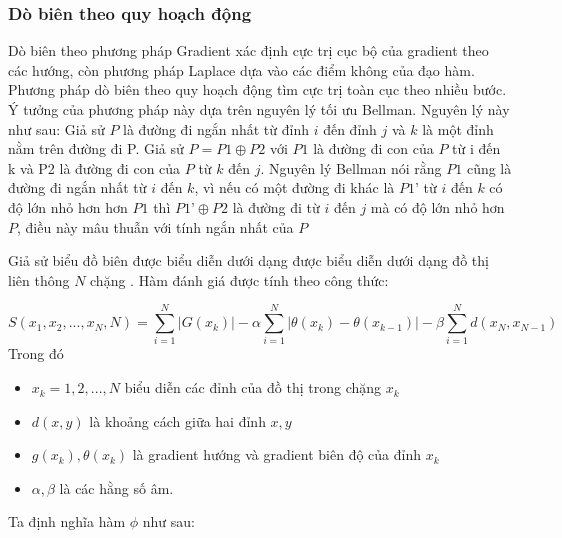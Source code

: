 \documentclass[12pt,oneside,a4]{report}
\begin{document}
\subsubsection{Dò biên theo quy hoạch động}
Dò biên theo phương pháp Gradient xác định cực trị cục bộ của gradient theo các hướng, còn phương pháp Laplace dựa vào các điểm không của đạo hàm. Phương pháp dò biên theo quy hoạch động tìm cực trị toàn cục theo nhiều bước. Ý tưởng của phương pháp này dựa trên nguyên lý tối ưu Bellman. Nguyên lý này như sau:
Giả sử $P$ là đường đi ngắn nhất từ đỉnh $i$ đến đỉnh $j$ và $k$ là một đỉnh nằm trên đường đi P. Giả sử $P=P1\oplus P2$ với $P1$ là đường đi con của $P$ từ i đến k và P2 là đường đi con của $P$ từ $k$ đến $j$. Nguyên lý Bellman nói rằng $P1$ cũng là đường đi ngắn nhất từ $i$ đến $k$, vì nếu có một đường đi khác là $P1’$ từ $i$ đến $k$ có độ lớn nhỏ hơn hơn $P1$ thì $P1’\oplus P2$ là đường đi từ $i$ đến $j$ mà có độ lớn nhỏ hơn $P$, điều này mâu thuẫn với tính ngắn nhất của $P$

Giả sử biểu đồ biên được biểu diễn dưới dạng được biểu diễn dưới dạng đồ thị liên thông $N$ chặng . Hàm đánh giá được tính theo công thức:

\begin{equation}
S(x_1,x_2,...,x_N,N)=\sum_{i=1}^{N}|G(x_k)|-\alpha \sum_{i=1}^{N}|\theta(x_k)-\theta(x_{k-1})|-\beta \sum_{i=1}^{N}d(x_N,x_{N-1})
\end{equation}
Trong đó 
\begin{itemize}
\item $x_k=1,2,..., N$ biểu diễn các đỉnh của đồ thị trong chặng $x_k$
\item $d(x,y)$ là khoảng cách giữa hai đỉnh $x, y$ 
\item $g(x_k), \theta(x_k)$ là gradient hướng và gradient biên độ của đỉnh $x_k$
\item $\alpha ,\beta$ là các hằng số âm. 
\end{itemize}
Ta định nghĩa hàm $\phi$ như sau:
\end{document}

